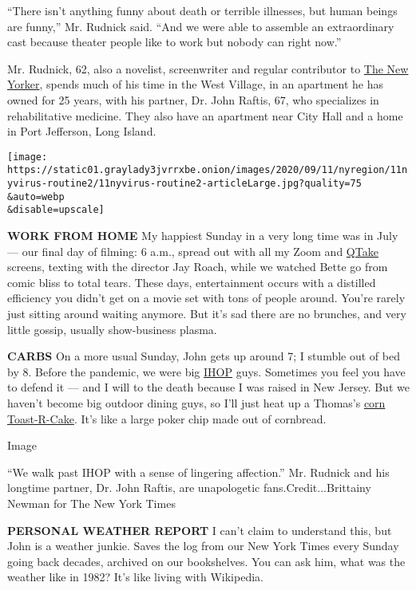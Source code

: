 ``There isn't anything funny about death or terrible illnesses, but
human beings are funny,'' Mr. Rudnick said. ``And we were able to
assemble an extraordinary cast because theater people like to work but
nobody can right now.''

Mr. Rudnick, 62, also a novelist, screenwriter and regular contributor
to \href{https://www.newyorker.com/contributors/paul-rudnick}{The New
Yorker}, spends much of his time in the West Village, in an apartment he
has owned for 25 years, with his partner, Dr. John Raftis, 67, who
specializes in rehabilitative medicine. They also have an apartment near
City Hall and a home in Port Jefferson, Long Island.

\texttt{[image: https://static01.graylady3jvrrxbe.onion/images/2020/09/11/nyregion/11nyvirus-routine2/11nyvirus-routine2-articleLarge.jpg?quality=75\\\&auto=webp\\\&disable=upscale]}

\textbf{WORK FROM HOME} My happiest Sunday in a very long time was in
July --- our final day of filming: 6 a.m., spread out with all my Zoom
and \href{https://qtakehd.com/}{QTake} screens, texting with the
director Jay Roach, while we watched Bette go from comic bliss to total
tears. These days, entertainment occurs with a distilled efficiency you
didn't get on a movie set with tons of people around. You're rarely just
sitting around waiting anymore. But it's sad there are no brunches, and
very little gossip, usually show-business plasma.

\textbf{CARBS} On a more usual Sunday, John gets up around 7; I stumble
out of bed by 8. Before the pandemic, we were big
\href{https://www.ihop.com/en/restaurants-new-york-ny/235-e-14th-st--237-3357}{IHOP}
guys. Sometimes you feel you have to defend it --- and I will to the
death because I was raised in New Jersey. But we haven't become big
outdoor dining guys, so I'll just heat up a Thomas's
\href{https://thomasbreads.com/products/corn-toast-r-cakes}{corn
Toast-R-Cake}. It's like a large poker chip made out of cornbread.

Image

``We walk past IHOP with a sense of lingering affection.'' Mr. Rudnick
and his longtime partner, Dr. John Raftis, are unapologetic
fans.Credit...Brittainy Newman for The New York Times

\textbf{PERSONAL WEATHER REPORT} I can't claim to understand this, but
John is a weather junkie. Saves the log from our New York Times every
Sunday going back decades, archived on our bookshelves. You can ask him,
what was the weather like in 1982? It's like living with Wikipedia.

